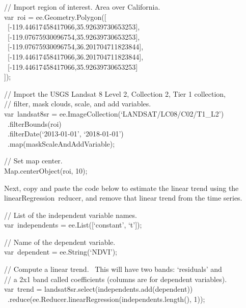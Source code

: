 \documentclass[
  letterpaper,
  DIV=11,
  numbers=noendperiod]{scrreprt}
\begin{document}
// Import region of interest. Area over California.\\
var~roi = ee.Geometry.Polygon({[}\\
\hspace*{0.333em} ~{[}-119.44617458417066,35.92639730653253{]},\\
\hspace*{0.333em} ~{[}-119.07675930096754,35.92639730653253{]},\\
\hspace*{0.333em} ~{[}-119.07675930096754,36.201704711823844{]},\\
\hspace*{0.333em} ~{[}-119.44617458417066,36.201704711823844{]},\\
\hspace*{0.333em} ~{[}-119.44617458417066,35.92639730653253{]}\\
{]});

// Import the USGS Landsat 8 Level 2, Collection 2, Tier 1 collection,\\
// filter, mask clouds, scale, and add variables.\\
var~landsat8sr = ee.ImageCollection(`LANDSAT/LC08/C02/T1\_L2')\\
\hspace*{0.333em} ~.filterBounds(roi)\\
\hspace*{0.333em} ~.filterDate(`2013-01-01', `2018-01-01')\\
\hspace*{0.333em} ~.map(maskScaleAndAddVariable);

// Set map center.\\
Map.centerObject(roi, 10);

Next, copy and paste the code below to estimate the linear trend using
the linearRegression~reducer, and remove that linear trend from the time
series.

// List of the independent variable names.\\
var~independents = ee.List({[}`constant', `t'{]});

// Name of the dependent variable.\\
var~dependent = ee.String(`NDVI');

// Compute a linear trend. ~This will have two bands: `residuals' and\\
// a 2x1 band called coefficients (columns are for dependent
variables).\\
var~trend = landsat8sr.select(independents.add(dependent))\\
\hspace*{0.333em}
~.reduce(ee.Reducer.linearRegression(independents.length(), 1));
\end{document}
